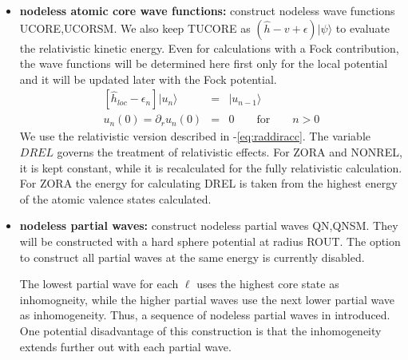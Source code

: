 \documentclass[11pt,a4paper]{report}
\begin{document}
\begin{itemize}
\item \textbf{nodeless atomic core wave functions:} construct nodeless
  wave functions UCORE,UCORSM. We also keep TUCORE as
  $(\hat{h}-v+\epsilon)|\psi\rangle$ to evaluate the relativistic
  kinetic energy.  Even for calculations with a Fock contribution, the
  wave functions will be determined here first only for the local
  potential and it will be updated later with the Fock potential.
\begin{eqnarray*}
\left[\hat{h}_{loc}-\epsilon_n\right]|u_n\rangle&=&|u_{n-1}\rangle
\\
u_n(0)=\partial_r u_n(0)&=&0\qquad\text{for}\qquad n>0
\end{eqnarray*}
We use the relativistic version described in
-\ref{eq:raddiracc}.
%
The variable $DREL$ governs the treatment of relativistic effects. For
ZORA and NONREL, it is kept constant, while it is recalculated for the
fully relativistic calculation. For ZORA the energy for calculating
DREL is taken from the highest energy of the atomic valence states
calculated.
%
\item \textbf{nodeless partial waves:} construct nodeless partial
  waves QN,QNSM.  They will be constructed with a hard sphere
  potential at radius ROUT.  The option to construct all partial waves
  at the same energy is currently disabled.

  The lowest partial wave for each $\ell$ uses the highest core state
  as inhomogneity, while the higher partial waves use the next lower
  partial wave as inhomogeneity. Thus, a sequence of nodeless partial
  waves in introduced. One potential disadvantage of this construction
  is that the inhomogeneity extends further out with each partial
  wave.


\end{itemize}
\end{document}
